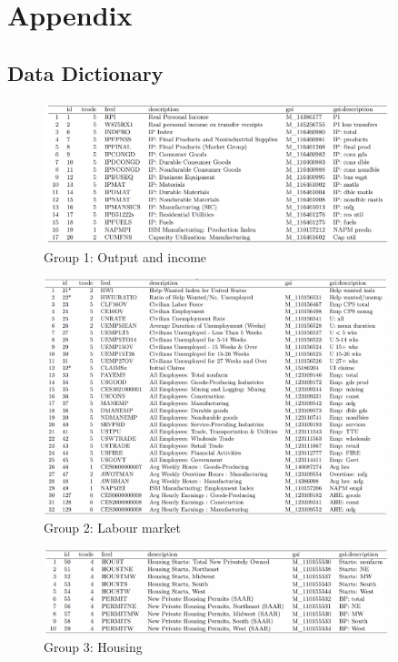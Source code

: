 \clearpage 
\section*{Appendix}

\subsection*{Data Dictionary}
\begin{figure}[h!]
        \centering
        \caption*{Group 1: Output and income}
        \includegraphics[width=0.9\textwidth]{figures/G1.png}
\end{figure}

\begin{figure}
        \centering
        \caption*{Group 2: Labour market}
        \includegraphics[width=0.9\textwidth]{figures/G2.png}
\end{figure}

\begin{figure}
        \centering
        \caption*{Group 3: Housing}
        \includegraphics[width=0.9\textwidth]{figures/G3.png}
\end{figure}

